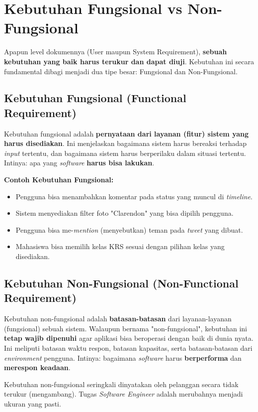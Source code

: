 \documentclass[12pt,a4paper]{article}
\begin{document}
\newpage
\section{Kebutuhan Fungsional vs Non-Fungsional}

Apapun level dokumennya (User maupun System Requirement), \textbf{sebuah kebutuhan yang baik harus terukur dan dapat diuji}. Kebutuhan ini secara fundamental dibagi menjadi dua tipe besar: Fungsional dan Non-Fungsional.

\subsection{Kebutuhan Fungsional (Functional Requirement)}
Kebutuhan fungsional adalah \textbf{pernyataan dari layanan (fitur) sistem yang harus disediakan}. Ini menjelaskan bagaimana sistem harus bereaksi terhadap \textit{input} tertentu, dan bagaimana sistem harus berperilaku dalam situasi tertentu. Intinya: apa yang \textit{software} \textbf{harus bisa lakukan}.

\textbf{Contoh Kebutuhan Fungsional:}
\begin{itemize}
    \item Pengguna bisa menambahkan komentar pada status yang muncul di \textit{timeline}.
    \item Sistem menyediakan filter foto "Clarendon" yang bisa dipilih pengguna.
    \item Pengguna bisa me-\textit{mention} (menyebutkan) teman pada \textit{tweet} yang dibuat.
    \item Mahasiswa bisa memilih kelas KRS sesuai dengan pilihan kelas yang disediakan.
\end{itemize}

\subsection{Kebutuhan Non-Fungsional (Non-Functional Requirement)}
Kebutuhan non-fungsional adalah \textbf{batasan-batasan} dari layanan-layanan (fungsional) sebuah sistem. Walaupun bernama "non-fungsional", kebutuhan ini \textbf{tetap wajib dipenuhi} agar aplikasi bisa beroperasi dengan baik di dunia nyata. Ini meliputi batasan waktu respon, batasan kapasitas, serta batasan-batasan dari \textit{environment} pengguna. Intinya: bagaimana \textit{software} harus \textbf{berperforma} dan \textbf{merespon keadaan}.

Kebutuhan non-fungsional seringkali dinyatakan oleh pelanggan secara tidak terukur (mengambang). Tugas \textit{Software Engineer} adalah merubahnya menjadi ukuran yang pasti.
\end{document}
